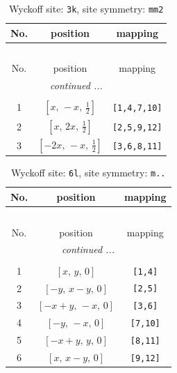 \documentclass[fleqn,8pt]{jsarticle}
\begin{document}
\begin{longtable}{ccc}
\caption{Wyckoff site: {\tt 3k}, site symmetry: {\tt mm2}}
 \\
 \hline \hline
No. & position & mapping \\ \hline \endfirsthead

\multicolumn{2}{l}{\tablename\ \thetable{}} \\
 \hline \hline
No. & position & mapping \\ \hline \endhead

 \hline \hline
\multicolumn{2}{r}{\footnotesize\it continued ...} \\ \endfoot

 \hline \hline
\multicolumn{2}{r}{} \\ \endlastfoot

1 & $\left[ x,\, - x,\, \frac{1}{2} \right]$ & {\tt [1,4,7,10]} \\ \hline
2 & $\left[ x,\, 2 x,\, \frac{1}{2} \right]$ & {\tt [2,5,9,12]} \\ \hline
3 & $\left[ - 2 x,\, - x,\, \frac{1}{2} \right]$ & {\tt [3,6,8,11]} \\
\end{longtable}
\renewcommand{\arraystretch}{1.2}
\begin{longtable}{ccc}
\caption{Wyckoff site: {\tt 6l}, site symmetry: {\tt m..}}
 \\
 \hline \hline
No. & position & mapping \\ \hline \endfirsthead

\multicolumn{2}{l}{\tablename\ \thetable{}} \\
 \hline \hline
No. & position & mapping \\ \hline \endhead

 \hline \hline
\multicolumn{2}{r}{\footnotesize\it continued ...} \\ \endfoot

 \hline \hline
\multicolumn{2}{r}{} \\ \endlastfoot

1 & $\left[ x,\, y,\, 0 \right]$ & {\tt [1,4]} \\ \hline
2 & $\left[ - y,\, x - y,\, 0 \right]$ & {\tt [2,5]} \\ \hline
3 & $\left[ - x + y,\, - x,\, 0 \right]$ & {\tt [3,6]} \\ \hline
4 & $\left[ - y,\, - x,\, 0 \right]$ & {\tt [7,10]} \\ \hline
5 & $\left[ - x + y,\, y,\, 0 \right]$ & {\tt [8,11]} \\ \hline
6 & $\left[ x,\, x - y,\, 0 \right]$ & {\tt [9,12]} \\
\end{longtable}
\end{document}
